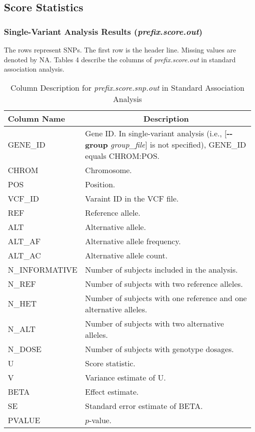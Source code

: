 \documentclass[12pt,letter]{article}
\begin{document}
\subsection{Score Statistics}
\subsubsection{Single-Variant Analysis Results ({\it prefix.score.out})}
The rows represent SNPs. 
The first row is the header line. Missing values are denoted by {\ttfamily NA}.
Tables 4 describe the columns of {\it prefix.score.out} in standard association analysis.

{\centering
\begin{longtable}{p{4cm}p{11cm}}
\caption{Column Description for {\it prefix.score.snp.out} in Standard Association Analysis} \\
\hline\hline
\multicolumn{1}{l}{Column Name} & \multicolumn{1}{c}{Description} \\
\hline
{GENE\_ID} & Gene ID. In single-variant analysis (i.e., [{\bf -{}-group} {\it group\_file}] is not specified), {GENE\_ID} equals CHROM:POS. \\
{CHROM} & Chromosome. \\
{POS} & Position. \\
{VCF\_ID} & Varaint ID in the VCF file. \\
{REF} & Reference allele.\\
{ALT} & Alternative allele.\\
{ALT\_AF} & Alternative allele frequency.\\
{ALT\_AC} & Alternative allele count. \\
{N\_INFORMATIVE} & Number of subjects included in the analysis.\\
{N\_REF} & Number of subjects with two reference alleles.\\
{N\_HET} & Number of subjects with one reference and one alternative alleles.\\
{N\_ALT} & Number of subjects with two alternative alleles. \\
{N\_DOSE} & Number of subjects with genotype dosages. \\ 
{U} & Score statistic. \\
{V} & Variance estimate of U. \\
{BETA} & Effect estimate. \\
{SE} & Standard error estimate of BETA. \\
{PVALUE} & $p$-value. \\
\hline
\end{longtable}}
\end{document}
